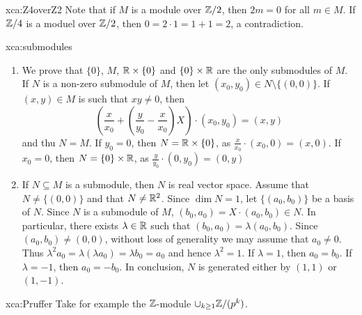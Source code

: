 \begin{sol}{xca:Z4overZ2}
	Note that if $M$ is a module over $\mathbb{Z}/2$, then $2m=0$ 
	for all $m\in M$.  If
	$\mathbb{Z}/4$ is a moduel over $\mathbb{Z}/2$, 
	then $0=2\cdot 1=1+1=2$, a contradiction. 
\end{sol}

\begin{sol}{xca:submodules}
    \begin{enumerate}
        \item We prove that $\{0\}$, $M$, $\mathbb{R}\times\{0\}$ and $\{0\}\times\mathbb{R}$ are
        the only submodules of $M$. If $N$ is a non-zero submodule of $M$, then
        let $(x_0,y_0)\in N\setminus\{(0,0)\}$. If $(x,y)\in M$ is such that $xy\ne 0$, then
        \[
            \left(\frac{x}{x_0}+\left(\frac{y}{y_0}-\frac{x}{x_0}\right)X\right)\cdot (x_0,y_0)=(x,y) 
        \]
        and thu $N=M$. If $y_0=0$, then $N=\mathbb{R}\times\{0\}$, as $\frac{x}{x_0}\cdot (x_0,0)=(x,0)$. If $x_0=0$, then
        $N=\{0\}\times\mathbb{R}$, as 
        $\frac{y}{y_0}\cdot (0,y_0)=(0,y)$ 
            \item If $N\subseteq M$ is a submodule, then $N$ is real vector space. Assume that 
            $N\ne\{(0,0)\}$ and that $N\ne\mathbb{R}^2$. Since $\dim N=1$, 
            let $\{(a_0,b_0)\}$ be a basis of $N$. Since $N$ is a submodule of $M$, 
            $(b_0,a_0)=X\cdot (a_0,b_0)\in N$. In particular, there exists 
            $\lambda\in\mathbb{R}$ such that $(b_0,a_0)=\lambda (a_0,b_0)$. Since $(a_0,b_0)\ne(0,0)$, 
            without loss of generality we may assume that 
            $a_0\ne 0$. Thus 
            $\lambda^2 a_0=\lambda (\lambda a_0)=\lambda b_0=a_0$ and hence
            $\lambda^2=1$. If $\lambda=1$, then 
            $a_0=b_0$. If $\lambda=-1$, then $a_0=-b_0$. In conclusion, $N$ 
            is generated either by $(1,1)$ or $(1,-1)$.  
    \end{enumerate}
\end{sol}


\begin{sol}{xca:Pruffer}
	Take for example the $\mathbb{Z}$-module $\cup_{k\geq1}\mathbb{Z}/(p^k)$.
\end{sol}


